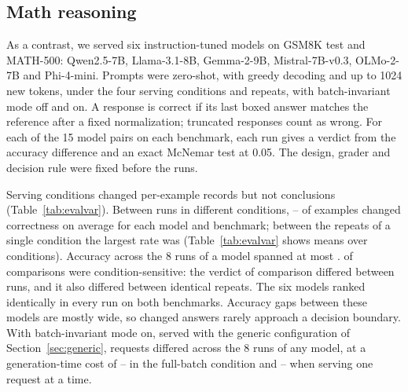 \subsection{Math reasoning}\label{sec:mathvar}
As a contrast, we served six instruction-tuned models on GSM8K test and MATH-500: Qwen2.5-7B, Llama-3.1-8B, Gemma-2-9B, Mistral-7B-v0.3, OLMo-2-7B and Phi-4-mini. Prompts were zero-shot, with greedy decoding and up to 1024 new tokens, under the four serving conditions and repeats, with batch-invariant mode off and on. A response is correct if its last boxed answer matches the reference after a fixed normalization; truncated responses count as wrong. For each of the 15 model pairs on each benchmark, each run gives a verdict from the accuracy difference and an exact McNemar test at 0.05. The design, grader and decision rule were fixed before the runs.

\begin{table}[t]\centering\small

\caption{Serving conditions and evaluation records. Accuracy ranges span the 8 runs with batch-invariant mode off; flips are the mean share of examples whose correctness differs between runs of different conditions (between) or between the two repeats of a condition (within), for GSM8K/MATH-500. BI-on differing: requests whose tokens are not identical across all 8 runs with the mode on. BI-on time: generation time against the mode off in the full-batch condition.}\label{tab:evalvar}
\end{table}

Serving conditions changed per-example records but not conclusions (Table~\ref{tab:evalvar}). Between runs in different conditions, \EvFlipBetweenMin{}--\EvFlipBetweenMax{} of examples changed correctness on average for each model and benchmark; between the repeats of a single condition the largest rate was \EvFlipWithinMax{} (Table~\ref{tab:evalvar} shows means over conditions). Accuracy across the 8 runs of a model spanned at most \EvSpreadMax{}. \EvChangedCond{} of \EvComparisons{} comparisons were condition-sensitive: the verdict of \EvChangedRepeat{} comparison differed between runs, and it also differed between identical repeats. The six models ranked identically in every run on both benchmarks. Accuracy gaps between these models are mostly wide, so changed answers rarely approach a decision boundary. With batch-invariant mode on, served with the generic configuration of Section~\ref{sec:generic}, \EvBiDiffer{} requests differed across the 8 runs of any model, at a generation-time cost of \EvTimeCTwoMin{}--\EvTimeCTwoMax{} in the full-batch condition and \EvTimeCOneMin{}--\EvTimeCOneMax{} when serving one request at a time.

